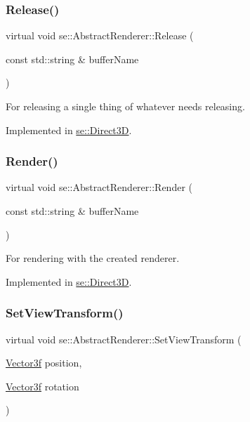 \subsubsection{\texorpdfstring{Release()}{Release()}\hspace{0.1cm}{\footnotesize\ttfamily [2/2]}}
{\footnotesize\ttfamily virtual void se\+::\+Abstract\+Renderer\+::\+Release (\begin{DoxyParamCaption}\item[{const std\+::string \&}]{buffer\+Name }\end{DoxyParamCaption})\hspace{0.3cm}{\ttfamily [pure virtual]}}

For releasing a single thing of whatever needs releasing. 

Implemented in \mbox{\hyperlink{classse_1_1_direct3_d_a77f814cda45f2b490e11c522f8e752e3}{se\+::\+Direct3D}}.

\mbox{\label{classse_1_1_abstract_renderer_a76058a91574874ab3c51294a2c9ea85c}} 
\subsubsection{\texorpdfstring{Render()}{Render()}}
{\footnotesize\ttfamily virtual void se\+::\+Abstract\+Renderer\+::\+Render (\begin{DoxyParamCaption}\item[{const std\+::string \&}]{buffer\+Name }\end{DoxyParamCaption})\hspace{0.3cm}{\ttfamily [pure virtual]}}

For rendering with the created renderer. 

Implemented in \mbox{\hyperlink{classse_1_1_direct3_d_a31e3c97cd8ceeaea58017b66bd60b9d7}{se\+::\+Direct3D}}.

\mbox{\label{classse_1_1_abstract_renderer_a710e67232e977fbb3b74f79640e0b62e}} 
\subsubsection{\texorpdfstring{Set\+View\+Transform()}{SetViewTransform()}}
{\footnotesize\ttfamily virtual void se\+::\+Abstract\+Renderer\+::\+Set\+View\+Transform (\begin{DoxyParamCaption}\item[{\mbox{\hyperlink{namespacese_a12e07512d95e2fdebdaf74a5ea2cf5f6}{Vector3f}}}]{position,  }\item[{\mbox{\hyperlink{namespacese_a12e07512d95e2fdebdaf74a5ea2cf5f6}{Vector3f}}}]{rotation }\end{DoxyParamCaption})\hspace{0.3cm}{\ttfamily [pure virtual]}}

